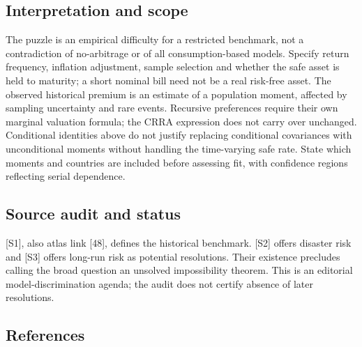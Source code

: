 \documentclass[11pt,a4paper]{article}
\begin{document}
\subsection*{Interpretation and scope}
The puzzle is an empirical difficulty for a restricted benchmark, not a contradiction of no-arbitrage or of all consumption-based models. Specify return frequency, inflation adjustment, sample selection and whether the safe asset is held to maturity; a short nominal bill need not be a real risk-free asset. The observed historical premium is an estimate of a population moment, affected by sampling uncertainty and rare events. Recursive preferences require their own marginal valuation formula; the CRRA expression does not carry over unchanged. Conditional identities above do not justify replacing conditional covariances with unconditional moments without handling the time-varying safe rate. State which moments and countries are included before assessing fit, with confidence regions reflecting serial dependence.

\subsection*{Source audit and status}
[S1], also atlas link [48], defines the historical benchmark. [S2] offers disaster risk and [S3] offers long-run risk as potential resolutions. Their existence precludes calling the broad question an unsolved impossibility theorem. This is an editorial model-discrimination agenda; the audit does not certify absence of later resolutions.

\subsection*{References}
\end{document}
